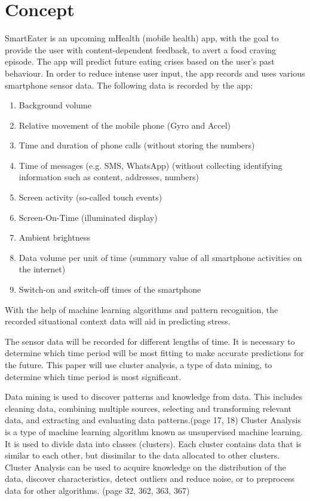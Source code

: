 \documentclass[12pt,a4paper]{article}
\title{\titlename}
\author{ \authorid\\ \scriptsize \address }
\date{\exposedate}
\begin{document}

\maketitle

\section*{Concept}


SmartEater is an upcoming mHealth (mobile health) app, with the goal to provide the user with content-dependent feedback, to avert a food craving episode. The app will predict future eating crises based on the user's past behaviour. In order to reduce intense user input, the app records and uses various smartphone sensor data. The following data is recorded by the app:

\begin{enumerate}
	\item Background volume
	\item Relative movement of the mobile phone (Gyro and Accel)
	\item Time and duration of phone calls (without storing the numbers)
	\item Time of messages (e.g. SMS, WhatsApp) (without collecting identifying information such as content, addresses, numbers)
	\item Screen activity (so-called touch events)
	\item Screen-On-Time (illuminated display)
	\item Ambient brightness
	\item Data volume per unit of time (summary value of all smartphone activities on the internet)
	\item Switch-on and switch-off times of the smartphone
\end{enumerate}
 With the help of machine learning algorithms and pattern recognition, the recorded situational context data will aid in predicting stress.


The sensor data will be recorded for different lengths of time. It is necessary to determine which time period will be most fitting to make accurate predictions for the future. This paper will use cluster analysis, a type of data mining, to determine which time period is most significant.

Data mining is used to discover patterns and knowledge from data. This includes cleaning data, combining multiple sources, selecting and transforming relevant data, and extracting and evaluating data patterns.(page 17, 18) 
Cluster Analysis is a type of machine learning algorithm known as unsupervised machine learning. It is used to divide data into classes (clusters). Each cluster contains data that is similar to each other, but dissimilar to the data allocated to other clusters. Cluster Analysis can be used to acquire knowledge on the distribution of the data, discover characteristics, detect outliers and reduce noise, or to preprocess data for other algorithms. (page 32, 362, 363, 367)
\end{document}
